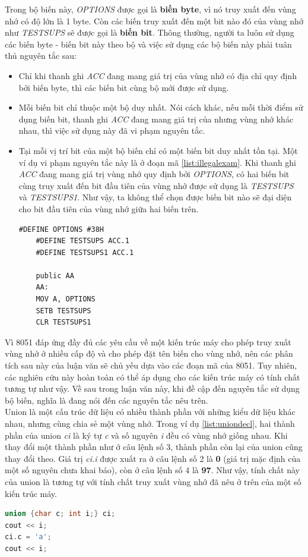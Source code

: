 Trong bộ biến này, \textit{OPTIONS} được gọi là \textbf{biến byte}, vì nó truy xuất đến vùng nhớ có độ lớn là 1 byte. Còn các biến truy xuất đến một bit nào đó của vùng nhớ như \textit{TESTSUPS} sẽ được gọi là \textbf{biến bit}. Thông thường, người ta luôn sử dụng các biến byte - biến bit này theo bộ và việc sử dụng các bộ biến này phải tuân thủ nguyên tắc sau: 
\begin{itemize}
	\item Chỉ khi thanh ghi \textit{ACC} đang mang giá trị của vùng nhớ có địa chỉ quy định bởi biến byte, thì các biến bit cùng bộ mới được sử dụng.
	\item Mỗi biến bit chỉ thuộc một bộ duy nhất. Nói cách khác, nếu mỗi thời điểm sử dụng biến bit, thanh ghi \textit{ACC} đang mang giá trị của nhưng vùng nhớ khác nhau, thì việc sử dụng này đã vi phạm nguyên tắc.
	\item Tại mỗi vị trí bit của một bộ biến chỉ có một biến bit duy nhất tồn tại. Một ví dụ vi phạm nguyên tắc này là ở đoạn mã \ref{list:illegalexam}. Khi thanh ghi \textit{ACC} đang mang giá trị vùng nhớ quy định bởi \textit{OPTIONS}, có hai biến bit cùng truy xuất đến bit đầu tiên của vùng nhớ được sử dụng là \textit{TESTSUPS} và \textit{TESTSUPS1}. Như vậy, ta không thể chọn được biến bit nào sẽ đại diện cho bit đầu tiên của vùng nhớ giữa hai biến trên.
	\begin{lstlisting}[caption={Một ví dụ vi phạm nguyên tắc sử dụng bộ biến},label={list:illegalexam}]
	#DEFINE OPTIONS #38H
	#DEFINE TESTSUPS ACC.1
	#DEFINE TESTSUPS1 ACC.1
	
	public AA
	AA:
	MOV A, OPTIONS
	SETB TESTSUPS
	CLR TESTSUPS1
	\end{lstlisting}
\end{itemize}
Vì 8051 đáp ứng đầy đủ các yêu cầu về một kiến trúc máy cho phép truy xuất vùng nhớ ở nhiều cấp độ và cho phép đặt tên biến cho vùng nhớ, nên các phân tích sau này của luận văn sẽ chủ yếu dựa vào các đoạn mã của 8051. Tuy nhiên, các nghiên cứu này hoàn toàn có thể áp dụng cho các kiến trúc máy có tính chất tương tự như vậy. Về sau trong luận văn này, khi đề cập đến nguyên tắc sử dụng bộ biến, nghĩa là đang nói đến các nguyên tắc nêu trên. \\

Union là một cấu trúc dữ liệu có nhiều thành phần với những kiểu dữ liệu khác nhau, nhưng cùng chia sẻ một vùng nhớ. Trong ví dụ \ref{list:uniondecl}, hai thành phần của union \textit{ci} là ký tự \textit{c} và số nguyên \textit{i} đều có vùng nhớ giống nhau. Khi thay đổi một thành phần như ở câu lệnh số 3, thành phần còn lại của union cũng thay đổi theo. Giá trị \textit{ci.i} được xuất ra ở câu lệnh số 2 là \textbf{0} (giá trị mặc định của một số nguyên chưa khai báo), còn ở câu lệnh số 4 là \textbf{97}. Như vậy, tính chất này của union là tương tự với tính chất truy xuất vùng nhớ đã nêu ở trên của một số kiến trúc máy.\\
\begin{lstlisting}[caption={Một đoạn khai báo union},label={list:uniondecl},language=c++]
union {char c; int i;} ci;
cout << i;
ci.c = 'a';
cout << i;
\end{lstlisting}

